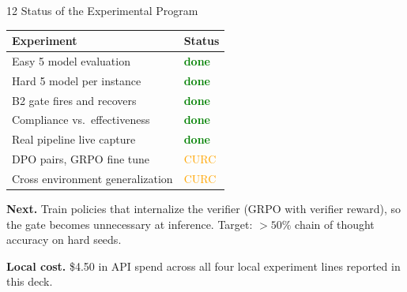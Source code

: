 \documentclass[aspectratio=169, 10pt]{beamer}
\newcommand{\hi}[1]{\textcolor{Green}{\textbf{#1}}}
\newcommand{\midcol}[1]{\textcolor{Orange}{#1}}
\begin{document}
\begin{frame}{12 \quad Status of the Experimental Program}
\vspace{0.3em}
\centering
\begin{tabular}{@{}p{7.5cm}l@{}}
  \toprule
  \textbf{Experiment} & \textbf{Status} \\
  \midrule
  Easy 5 model evaluation          & \hi{done} \\
  Hard 5 model per instance        & \hi{done} \\
  B2 gate fires and recovers       & \hi{done} \\
  Compliance vs.\ effectiveness    & \hi{done} \\
  Real pipeline live capture       & \hi{done} \\
  DPO pairs, GRPO fine tune        & \midcol{CURC} \\
  Cross environment generalization & \midcol{CURC} \\
  \bottomrule
\end{tabular}

\vspace{0.7em}
\raggedright

\textbf{Next.} Train policies that internalize the verifier
(GRPO with verifier reward), so the gate becomes unnecessary
at inference. Target: $>50\%$ chain of thought accuracy on
hard seeds.

\textbf{Local cost.} \$4.50 in API spend across all four local
experiment lines reported in this deck.
\end{frame}
\end{document}
